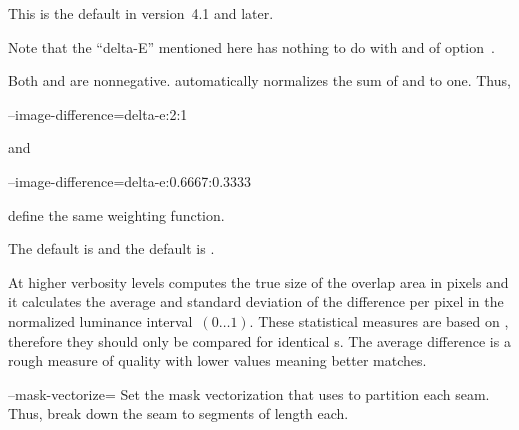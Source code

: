 \begin{codelist}
\begin{codelist}
    This is the default in \App{} version~4.1 and later.

    Note that the ``delta-E'' mentioned here has nothing to do with  and
     of option~.
  \end{codelist}

  \begin{sloppypar}
    Both  and  are nonnegative.
    \App{} automatically normalizes the sum of  and
     to one.  Thus,
  \end{sloppypar}

  \begin{literal}
    --image-difference=delta-e:2:1
  \end{literal}

  and

  \begin{literal}
    --image-difference=delta-e:0.6667:0.3333
  \end{literal}

  define the same weighting function.

  The default  is 
  and the default  is
  .

  At higher verbosity levels \App{} computes the true size of the overlap area in pixels and it
  calculates the average and standard deviation of the difference per pixel in the normalized
  luminance interval~$(0\dots1)$.  These statistical measures are based on ,
  therefore they should only be compared for identical s.  The average
  difference is a rough measure of quality with lower values meaning better matches.


  \label{opt:mask-vectorize}%
\item[--mask-vectorize=\metavar{DISTANCE}]\itemend
  Set the mask vectorization  that \App{} uses to partition each seam.  Thus,
  break down the seam to segments of length  each.


\end{codelist}

